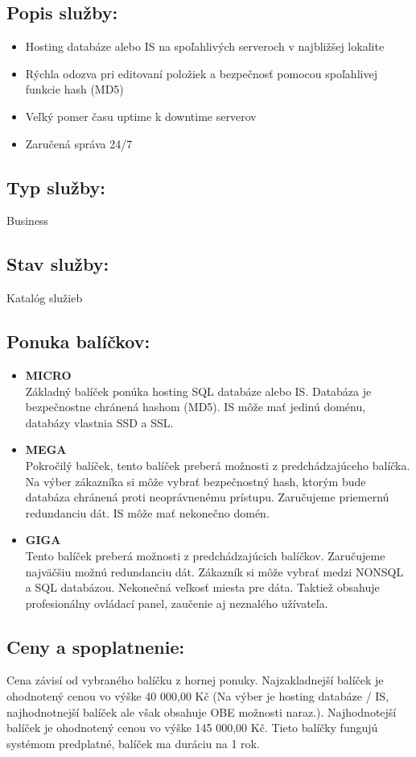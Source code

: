 \documentclass[a4paper, 11pt]{article}
\begin{document}
\subsection*{Popis služby:}
\begin{itemize}
\item Hosting databáze alebo IS na spoľahlivých serveroch v najbližšej lokalite
\item Rýchla odozva pri editovaní položiek a bezpečnosť pomocou spoľahlivej funkcie hash (MD5)
\item Veľký pomer času uptime k downtime serverov
\item Zaručená správa 24/7
\end{itemize}
\subsection*{Typ služby:}
Business
\subsection*{Stav služby:}
Katalóg služieb
\subsection*{Ponuka balíčkov:}
\begin{itemize}
\item \textbf{MICRO}\\
Základný balíček ponúka hosting SQL databáze alebo IS. Databáza je bezpečnostne chránená hashom (MD5). IS môže mať jedinú doménu, databázy vlastnia SSD a SSL.
\item \textbf{MEGA}\\
Pokročilý balíček, tento balíček preberá možnosti z predchádzajúceho balíčka. Na výber zákazníka si môže vybrať bezpečnostný hash, ktorým bude databáza chránená proti neoprávnenému prístupu. Zaručujeme priemernú redundanciu dát. IS môže mať nekonečno domén.
\item \textbf{GIGA}\\
Tento balíček preberá možnosti z predchádzajúcich balíčkov. Zaručujeme najväčšiu možnú redundanciu dát. Zákazník si môže vybrať medzi NONSQL a SQL databázou. Nekonečná veľkosť miesta pre dáta. Taktiež obsahuje profesionálny ovládací panel, zaučenie aj neznalého užívateľa.
\end{itemize}
\subsection*{Ceny a spoplatnenie:}
Cena závisí od vybraného balíčku z hornej ponuky. Najzakladnejší balíček je ohodnotený cenou vo výške 40 000,00 Kč (Na výber je hosting databáze / IS, najhodnotnejší balíček ale však obsahuje OBE možnosti naraz.). Najhodnotejší balíček je ohodnotený cenou vo výške 145 000,00 Kč. Tieto balíčky fungujú systémom predplatné, balíček ma duráciu na 1 rok.
\end{document}
